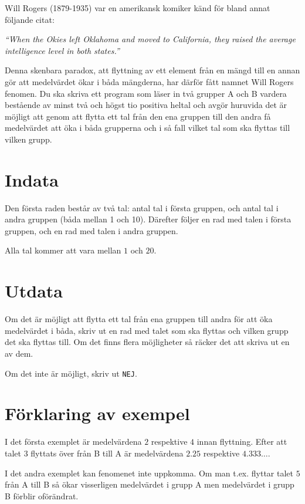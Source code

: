 Will Rogers (1879-1935) var en amerikansk komiker känd för bland annat följande citat:

\emph{``When the Okies left Oklahoma and moved to California, they raised the average intelligence level in both states.''}

Denna skenbara paradox, att flyttning av ett element från en mängd till en annan gör att medelvärdet ökar i båda mängderna, har därför fått namnet Will Rogers fenomen.
Du ska skriva ett program som läser in två grupper A och B vardera bestående av minst två och högst tio positiva heltal och avgör huruvida det är möjligt att genom att flytta ett tal från den ena gruppen till den andra få medelvärdet att öka i båda grupperna och i så fall vilket tal som ska flyttas till vilken grupp.

\section*{Indata}
Den första raden består av två tal: antal tal i första gruppen, och antal tal i andra gruppen (båda mellan 1 och 10).
Därefter följer en rad med talen i första gruppen, och en rad med talen i andra gruppen.

Alla tal kommer att vara mellan $1$ och $20$.

\section*{Utdata}
Om det är möjligt att flytta ett tal från ena gruppen till andra för att öka medelvärdet i båda,
skriv ut en rad med talet som ska flyttas och vilken grupp det ska flyttas till.
Om det finns flera möjligheter så räcker det att skriva ut en av dem.

Om det inte är möjligt, skriv ut \texttt{NEJ}.

\section*{Förklaring av exempel}
I det första exemplet är medelvärdena $2$ respektive $4$ innan flyttning.
Efter att talet $3$ flyttats över från B till A är medelvärdena $2.25$ respektive $4.333\ldots$.

I det andra exemplet kan fenomenet inte uppkomma.
Om man t.ex. flyttar talet $5$ från A till B så ökar visserligen medelvärdet i grupp A men medelvärdet i grupp B förblir oförändrat.
